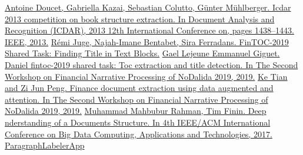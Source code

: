 \documentclass[a4paper,12pt]{article}
\begin{document}
 \begin{thebibliography}{}
     \href{https://hal.archives-ouvertes.fr/hal-01073396/document}{Antoine Doucet, Gabriella Kazai, Sebastian Colutto, Günter Mühlberger. Icdar 2013 competition on book structure extraction. In Document Analysis and Recognition (ICDAR), 2013 12th International Conference on, pages 1438–1443. IEEE, 2013.}
     \href{https://www.aclweb.org/anthology/W19-6407.pdf}{Rémi Juge, Najah-Imane Bentabet, Sira Ferradans. FinTOC-2019 Shared Task: Finding Title in Text Blocks.}
     \href{https://www.aclweb.org/anthology/W19-6409.pdf}{Gael Lejeune Emmanuel Giguet. Daniel fintoc-2019 shared task: Toc extraction and title detection. In The Second Workshop on Financial Narrative Processing of NoDalida 2019, 2019.}
     \href{http://www.ep.liu.se/ecp/165/001/ecp19165001.pdf}{Ke Tian and Zi Jun Peng. Finance document extraction using data augmented and attention. In The Second Workshop on Financial Narrative Processing of NoDalida 2019, 2019.}
     \href{https://dl.acm.org/doi/pdf/10.1145/3148055.3148080}{Muhammad Mahbubur Rahman, Tim Finin. Deep nderstanding of a Documents Structure. In 4th IEEE/ACM International Conference on Big Data Computing, Applications and Technologies, 2017.}
     \href{https://github.com/dronperminov/ParagraphLabelerApp}{ParagraphLabelerApp}
\end{thebibliography}
\end{document}
